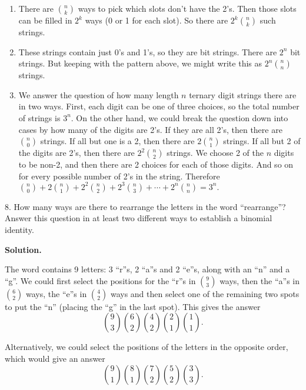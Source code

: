 \documentclass[10pt,]{book}
\theoremstyle{plain}
\theoremstyle{definition}
\theoremstyle{definition}
\theoremstyle{definition}
\numberwithin{equation}{section}
\begin{document}
\begin{exerciselist}
\begin{enumerate}[label=(\alph*)]
\item\hypertarget{li-554}{} There are \({n \choose k}\) ways to pick which slots don't have the 2's.  Then those slots can be filled in \(2^k\) ways (0 or 1 for each slot).  So there are \(2^k{n \choose k}\) such strings. %
\item\hypertarget{li-555}{} These strings contain just 0's and 1's, so they are bit strings.  There are \(2^n\) bit strings.  But keeping with the pattern above, we might write this as \(2^n {n \choose n}\) strings. %
\item\hypertarget{li-556}{} We answer the question of how many length \(n\) ternary digit strings there are in two ways.  First, each digit can be one of three choices, so the total number of strings is \(3^n\).  On the other hand, we could break the question down into cases by how many of the digits are 2's.  If they are all 2's, then there are \({n \choose 0}\) strings.  If all but one is a 2, then there are \(2{n \choose 1}\) strings.  If all but 2 of the digits are 2's, then there are \(2^2{n \choose 2}\) strings.  We choose 2 of the \(n\) digits to be non-2, and then there are 2 choices for each of those digits.  And so on for every possible number of 2's in the string. Therefore \( {n \choose 0} + 2{n \choose 1} + 2^2{n \choose 2} + 2^3{n \choose 3} + \cdots + 2^n{n \choose n} = 3^n. \) %
\end{enumerate}
\item[8.]\hypertarget{exercise-79}{}
          How many ways are there to rearrange the letters in the word ``rearrange''? Answer this question in at least two different ways to establish a binomial identity.
\par\smallskip
\par\smallskip
\noindent\textbf{Solution.}\hypertarget{solution-116}{}\quad

          The word contains 9 letters: 3 ``r''s, 2 ``a''s and 2 ``e''s, along with an ``n'' and a ``g''. We could first select the positions for the ``r''s in \({9 \choose 3}\) ways, then the ``a''s in \({6 \choose 2}\) ways, the ``e''s in \({4 \choose 2}\) ways and then select one of the remaining two spots to put the ``n'' (placing the ``g'' in the last spot). This gives the answer
          \begin{equation*}
            {9 \choose 3}{6 \choose 2}{4 \choose 2}{2\choose 1}{1\choose 1}.
          \end{equation*}
\par

          Alternatively, we could select the positions of the letters in the opposite order, which would give an answer
          \begin{equation*}
            {9 \choose 1}{8\choose 1}{7 \choose 2}{5\choose 2}{3\choose 3}.
          \end{equation*}
\par


\end{exerciselist}
\end{document}
